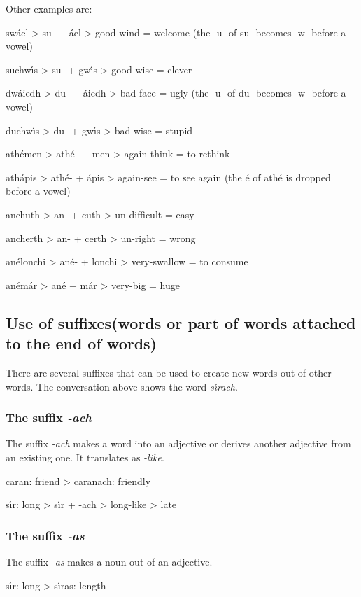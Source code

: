 Other examples are:

sw\'{a}el
> su- + \'{a}el > good-wind = welcome (the -u- of su- becomes -w- before a vowel)

suchw\'{\i}s
> su- + gw\'{\i}s > good-wise = clever

dw\'{a}iedh
> du- + \'{a}iedh > bad-face = ugly (the -u- of du- becomes -w- before a vowel)

duchw\'{\i}s
> du- + gw\'{\i}s > bad-wise = stupid

ath\'{e}men
> ath\'{e}- + men > again-think = to rethink

ath\'{a}pis
> ath\'{e}- + \'{a}pis > again-see = to see again (the \'{e} of ath\'{e} is dropped before a vowel)

anchuth
> an- + cuth > un-difficult = easy

ancherth
> an- + certh > un-right = wrong

an\'{e}lonchi
> an\'{e}- + lonchi > very-swallow = to consume

an\'{e}m\'{a}r
> an\'{e} + m\'{a}r > very-big = huge

\subsection{Use of suffixes(words or part of words attached to the end of words)}

There are several suffixes that can be used to create new words out of other words. The conversation above shows the word \textit{s\'{\i}rach}.

\subsubsection{The suffix \textit{-ach}}

The suffix \textit{-ach} makes a word into an adjective or derives another adjective from an existing one. It translates as \textit{-like}.

caran: friend
> caranach: friendly

s\'{\i}r: long
> s\'{\i}r + -ach > long-like > late

\subsubsection{The suffix \textit{-as}}

The suffix \textit{-as} makes a noun out of an adjective.

s\'{\i}r: long
> s\'{\i}ras: length

